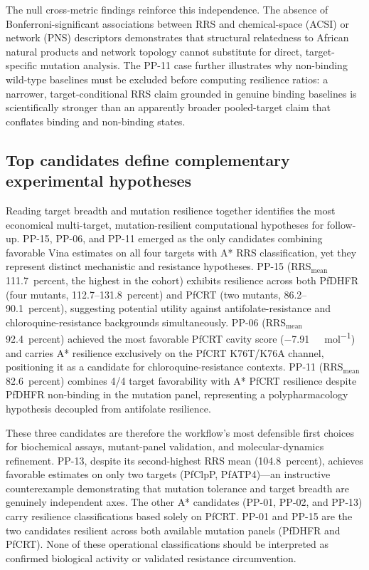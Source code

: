 \documentclass[journal=jcisd8,manuscript=article]{achemso}
\begin{document}
The null cross-metric findings reinforce this independence. The absence of Bonferroni-significant associations between RRS and chemical-space (ACSI) or network (PNS) descriptors demonstrates that structural relatedness to African natural products and network topology cannot substitute for direct, target-specific mutation analysis. The PP-11 case further illustrates why non-binding wild-type baselines must be excluded before computing resilience ratios: a narrower, target-conditional RRS claim grounded in genuine binding baselines is scientifically stronger than an apparently broader pooled-target claim that conflates binding and non-binding states.

\subsection{Top candidates define complementary experimental hypotheses}
Reading target breadth and mutation resilience together identifies the most economical multi-target, mutation-resilient computational hypotheses for follow-up. PP-15, PP-06, and PP-11 emerged as the only candidates combining favorable Vina estimates on all four targets with A* RRS classification, yet they represent distinct mechanistic and resistance hypotheses. PP-15 (RRS$_{\mathrm{mean}}$ \num{111.7}~percent, the highest in the cohort) exhibits resilience across both PfDHFR (four mutants, \numrange{112.7}{131.8}~percent) and PfCRT (two mutants, \num{86.2}--\num{90.1}~percent), suggesting potential utility against antifolate-resistance and chloroquine-resistance backgrounds simultaneously. PP-06 (RRS$_{\mathrm{mean}}$ \num{92.4}~percent) achieved the most favorable PfCRT cavity score (\num{-7.91}~\si{\kilo\calorie\per\mole}) and carries A* resilience exclusively on the PfCRT K76T/K76A channel, positioning it as a candidate for chloroquine-resistance contexts. PP-11 (RRS$_{\mathrm{mean}}$ \num{82.6}~percent) combines 4/4 target favorability with A* PfCRT resilience despite PfDHFR non-binding in the mutation panel, representing a polypharmacology hypothesis decoupled from antifolate resilience.

These three candidates are therefore the workflow's most defensible first choices for biochemical assays, mutant-panel validation, and molecular-dynamics refinement. PP-13, despite its second-highest RRS mean (\num{104.8}~percent), achieves favorable estimates on only two targets (PfClpP, PfATP4)—an instructive counterexample demonstrating that mutation tolerance and target breadth are genuinely independent axes. The other A* candidates (PP-01, PP-02, and PP-13) carry resilience classifications based solely on PfCRT. PP-01 and PP-15 are the two candidates resilient across both available mutation panels (PfDHFR and PfCRT). None of these operational classifications should be interpreted as confirmed biological activity or validated resistance circumvention.
\end{document}

